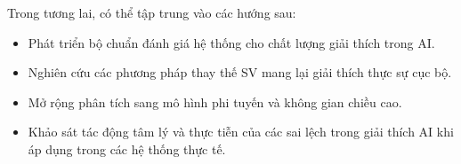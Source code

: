 \documentclass[12pt, a4paper]{article}
\theoremstyle{plain}
\theoremstyle{proposition}
\theoremstyle{lemma}
\begin{document}
Trong tương lai, có thể tập trung vào các hướng sau:
\begin{itemize}
    \item Phát triển bộ chuẩn đánh giá hệ thống cho chất lượng giải thích trong AI. 
    \item Nghiên cứu các phương pháp thay thế SV mang lại giải thích thực sự cục bộ. 
    \item Mở rộng phân tích sang mô hình phi tuyến và không gian chiều cao. 
    \item Khảo sát tác động tâm lý và thực tiễn của các sai lệch trong giải thích AI khi áp dụng trong các hệ thống thực tế. 
\end{itemize}


  
\end{document}
